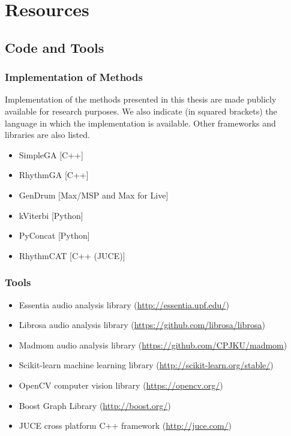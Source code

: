
\chapter{Resources}\label{app:resources}


\section*{Code and Tools}

\subsection*{Implementation of Methods}
Implementation of the methods presented in this thesis are made publicly available for research purposes. We also indicate (in squared brackets) the language in which the implementation is available. Other frameworks and libraries are also listed.

\begin{itemize}
	\item SimpleGA [C++]
	\item RhythmGA [C++]
	\item GenDrum [Max/MSP and Max for Live]
	\item kViterbi [Python] 
	\item PyConcat [Python]
	\item RhythmCAT [C++ (JUCE)]
\end{itemize}

\subsection*{Tools}

\begin{itemize}
	\item Essentia audio analysis library (\url{http://essentia.upf.edu/})
	\item Librosa audio analysis library (\url{https://github.com/librosa/librosa})
	\item Madmom audio analysis library (\url{https://github.com/CPJKU/madmom})
	\item Scikit-learn machine learning library (\url{http://scikit-learn.org/stable/})
	\item OpenCV computer vision library (\url{https://opencv.org/})
	\item Boost Graph Library (\url{http://boost.org/})
	\item JUCE cross platform C++ framework (\url{http://juce.com/})
\end{itemize}


